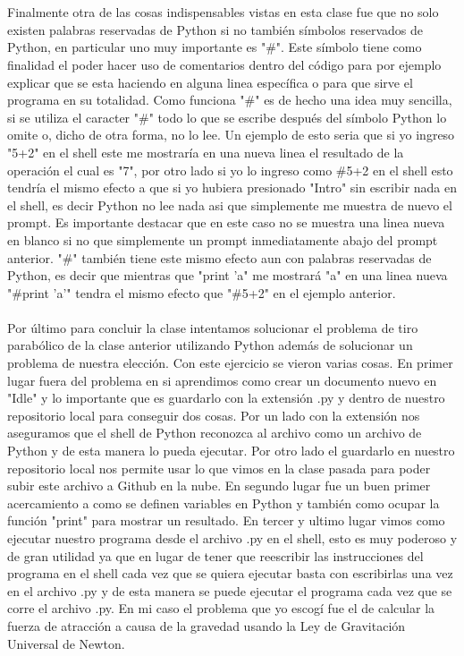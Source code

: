 \documentclass[letterpaper, 12pt, oneside]{article}
\begin{document}
	\\
	\\
	Finalmente otra de las cosas indispensables vistas en esta clase fue que no solo existen palabras reservadas de Python si no también símbolos reservados de Python, en particular uno muy importante es "\#". Este símbolo tiene como finalidad el poder hacer uso de comentarios dentro del código para por ejemplo explicar que se esta haciendo en alguna linea específica o para que sirve el programa en su totalidad. Como funciona "\#" es de hecho una idea muy sencilla, si se utiliza el caracter "\#" todo lo que se escribe después del símbolo Python lo omite o, dicho de otra forma, no lo lee. Un ejemplo de esto seria que si yo ingreso "5+2" en el shell este me mostraría en una nueva linea el resultado de la operación el cual es "7", por otro lado si yo lo ingreso como \#5+2 en el shell esto tendría el mismo efecto a que si yo hubiera presionado "Intro" sin escribir nada en el shell, es decir Python no lee nada asi que simplemente me muestra de nuevo el prompt. Es importante destacar que en este caso no se muestra una linea nueva en blanco si no que simplemente un prompt inmediatamente abajo del prompt anterior. "\#" también tiene este mismo efecto aun con palabras reservadas de Python, es decir que mientras que "print 'a" me mostrará "a" en una linea nueva "\#print 'a'" tendra el mismo efecto que "\#5+2" en el ejemplo anterior.
	\\
	\\
	Por último para concluir la clase intentamos solucionar el problema de tiro parabólico de la clase anterior utilizando Python además de solucionar un problema de nuestra elección. Con este ejercicio se vieron varias cosas. En primer lugar fuera del problema en si aprendimos como crear un documento nuevo en "Idle" y lo importante que es guardarlo con la extensión .py y dentro de nuestro repositorio local para conseguir dos cosas. Por un lado con la extensión nos aseguramos que el shell de Python reconozca al archivo como un archivo de Python y de esta manera lo pueda ejecutar. Por otro lado el guardarlo en nuestro repositorio local nos permite usar lo que vimos en la clase pasada para poder subir este archivo a Github en la nube. En segundo lugar fue un buen primer acercamiento a como se definen variables en Python y también como ocupar la función "print" para mostrar un resultado. En tercer y ultimo lugar vimos como ejecutar nuestro programa desde el archivo .py en el shell, esto es muy poderoso y de gran utilidad ya que en lugar de tener que reescribir las instrucciones del programa en el shell cada vez que se quiera ejecutar basta con escribirlas una vez en el archivo .py y de esta manera se puede ejecutar el programa cada vez que se corre el archivo .py. En mi caso el problema que yo escogí fue el de calcular la fuerza de atracción a causa de la gravedad usando la Ley de Gravitación Universal de Newton.
\end{document}
